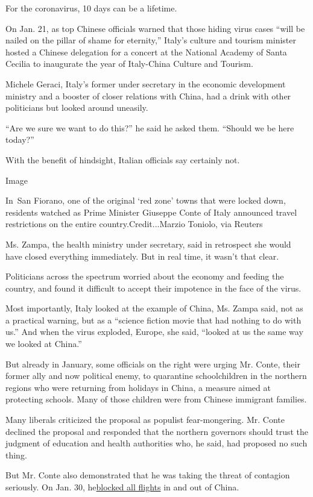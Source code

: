 For the coronavirus, 10 days can be a lifetime.

On Jan. 21, as top Chinese officials warned that those hiding virus
cases ``will be nailed on the pillar of shame for eternity,'' Italy's
culture and tourism minister hosted a Chinese delegation for a concert
at the National Academy of Santa Cecilia to inaugurate the year of
Italy-China Culture and Tourism.

Michele Geraci, Italy's former under secretary in the economic
development ministry and a booster of closer relations with China, had a
drink with other politicians but looked around uneasily.

``Are we sure we want to do this?'' he said he asked them. ``Should we
be here today?''

With the benefit of hindsight, Italian officials say certainly not.

Image

In~San Fiorano, one of the original `red zone' towns that were locked
down, residents watched as Prime Minister Giuseppe Conte of Italy
announced travel restrictions on the entire country.Credit...Marzio
Toniolo, via Reuters

Ms. Zampa, the health ministry under secretary, said in retrospect she
would have closed everything immediately. But in real time, it wasn't
that clear.

Politicians across the spectrum worried about the economy and feeding
the country, and found it difficult to accept their impotence in the
face of the virus.

Most importantly, Italy looked at the example of China, Ms. Zampa said,
not as a practical warning, but as a ``science fiction movie that had
nothing to do with us.'' And when the virus exploded, Europe, she said,
``looked at us the same way we looked at China.''

But already in January, some officials on the right were urging Mr.
Conte, their former ally and now political enemy, to quarantine
schoolchildren in the northern regions who were returning from holidays
in China, a measure aimed at protecting schools. Many of those children
were from Chinese immigrant families.

Many liberals criticized the proposal as populist fear-mongering. Mr.
Conte declined the proposal and responded that the northern governors
should trust the judgment of education and health authorities who, he
said, had proposed no such thing.

But Mr. Conte also demonstrated that he was taking the threat of
contagion seriously. On Jan. 30,
he\href{https://www.nytimes3xbfgragh.onion/2020/01/30/world/asia/coronavirus-china.html?searchResultPosition=16}{blocked
all flights} in and out of China.

